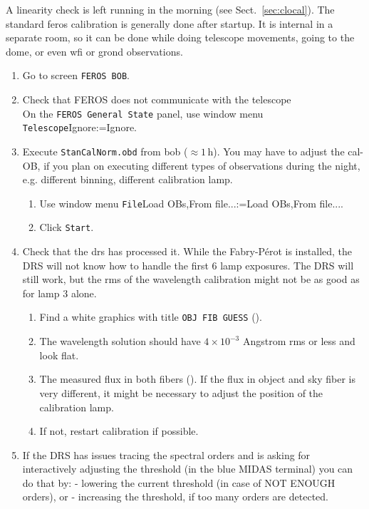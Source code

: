 \documentclass[11pt,fleqn,a4paper]{book}
\makeatletter
\def\menu#1#2{\texttt{#1}\ifx{}#2\else\@for\@x:=#2\do{$\rightarrow$\texttt{\@x}}\fi}
\def\wmenu#1#2{window menu \menu{#1}{#2}}
\def\fetchob{\wmenu{File}{Load OBs,From file...}}
\makeatother
\begin{document}
A linearity check is left running in the morning (see Sect.~\ref{sec:clocal}). The standard \gls{feros} calibration is generally done after startup.  It is internal in a separate room, so it can be done while doing telescope movements, going to the \gls{dome}, or even \gls{wfi} or \gls{grond} observations.

\begin{enumerate}
  \item Go to screen \texttt{FEROS BOB}.
  \item Check that FEROS does not communicate with the telescope\\
        On the \texttt{FEROS \gls{General State}} panel, use \wmenu{Telescope}{Ignore}.
  \item Execute \texttt{StanCalNorm.obd} from \gls{bob} ($\approx 1$\,h). You may have to adjust the cal-OB, if you plan on executing different types of observations during the night, e.g. different binning, different calibration lamp.
    \begin{enumerate}
       \item Use \fetchob.
       \item Click \texttt{Start}.
    \end{enumerate}
  \item Check that the \gls{drs} has processed it. While the Fabry-Pérot is installed, the DRS will not know how to handle the first 6 lamp exposures. The DRS will still work, but the rms of the wavelength calibration might not be as good as for lamp 3 alone. 
    \begin{enumerate}
      \item Find a white graphics with title \texttt{OBJ FIB GUESS} ().
      \item The wavelength solution should have $4 \times 10^{-3}$ Angstrom
         rms or less and look flat.
      \item The measured flux in both fibers (). If the flux in object and sky fiber is very different, it might be necessary to adjust the position of the calibration lamp.
      \item If not, restart calibration if possible.
    \end{enumerate}
   \item If the DRS has issues tracing the spectral orders and is asking for interactively adjusting the threshold (in the blue MIDAS terminal) you can do that by: - lowering the current threshold (in case of NOT ENOUGH orders), or - increasing the threshold, if too many orders are detected.   
\end{enumerate}
\end{document}
